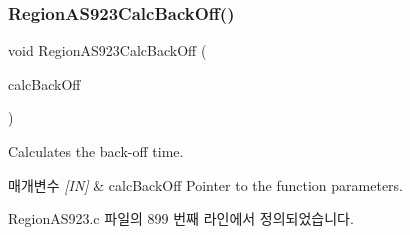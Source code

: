 \subsubsection{\texorpdfstring{Region\+A\+S923\+Calc\+Back\+Off()}{RegionAS923CalcBackOff()}}
{\footnotesize\ttfamily void Region\+A\+S923\+Calc\+Back\+Off (\begin{DoxyParamCaption}\item[{\mbox{\hyperlink{group___r_e_g_i_o_n_ga7c5c9a8da174e6679eded8257dc92fd9}{Calc\+Back\+Off\+Params\+\_\+t}} $\ast$}]{calc\+Back\+Off }\end{DoxyParamCaption})}



Calculates the back-\/off time. 


\begin{DoxyParams}{매개변수}
{\em \mbox{[}\+I\+N\mbox{]}} & calc\+Back\+Off Pointer to the function parameters. \\
\hline
\end{DoxyParams}


Region\+A\+S923.\+c 파일의 899 번째 라인에서 정의되었습니다.


